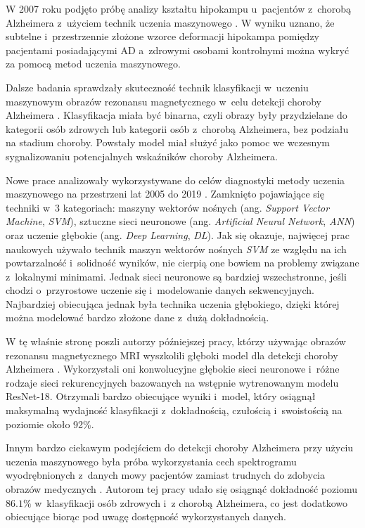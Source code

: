 {W 2007 roku podjęto próbę analizy kształtu hipokampu u~pacjentów z~chorobą Alzheimera z~użyciem technik uczenia maszynowego \cite{li2007hippocampal}.
W wyniku uznano, że subtelne i~przestrzennie złożone wzorce deformacji hipokampa pomiędzy pacjentami posiadającymi AD a~zdrowymi osobami kontrolnymi można wykryć za pomocą metod uczenia maszynowego.

Dalsze badania sprawdzały skuteczność technik klasyfikacji w~uczeniu maszynowym obrazów rezonansu magnetycznego w~celu detekcji choroby Alzheimera \cite{herrera2013classification}.
Klasyfikacja miała być binarna, czyli obrazy były przydzielane do kategorii osób zdrowych lub kategorii osób z~chorobą Alzheimera, bez podziału na stadium choroby.
Powstały model miał służyć jako pomoc we wczesnym sygnalizowaniu potencjalnych wskaźników choroby Alzheimera.

Nowe prace analizowały wykorzystywane do celów diagnostyki metody uczenia maszynowego na przestrzeni lat 2005 do 2019 \cite{tanveer2020machine}.
Zamknięto pojawiające się techniki w~3 kategoriach: maszyny wektorów nośnych (ang. \emph{Support Vector Machine}, \emph{SVM}), sztuczne sieci neuronowe (ang. \emph{Artificial Neural Network}, \emph{ANN}) oraz uczenie głębokie (ang. \emph{Deep Learning}, \emph{DL}).
Jak się okazuje, najwięcej prac naukowych używało technik maszyn wektorów nośnych \emph{SVM} ze względu na ich powtarzalność i~solidność wyników, nie cierpią one bowiem na problemy związane z~lokalnymi minimami.
Jednak sieci neuronowe są bardziej wszechstronne, jeśli chodzi o~przyrostowe uczenie się i~modelowanie danych sekwencyjnych.
Najbardziej obiecująca jednak była technika uczenia głębokiego, dzięki której można modelować bardzo złożone dane z~dużą dokładnością.

W tę właśnie stronę poszli autorzy późniejszej pracy, którzy używając obrazów rezonansu magnetycznego MRI wyszkolili głęboki model dla detekcji choroby Alzheimera \cite{ebrahimi2021deep}.
Wykorzystali oni konwolucyjne głębokie sieci neuronowe i~różne rodzaje sieci rekurencyjnych bazowanych na wstępnie wytrenowanym modelu ResNet-18.
Otrzymali bardzo obiecujące wyniki i~model, który osiągnął maksymalną wydajność klasyfikacji z~dokładnością, czułością i~swoistością na poziomie około 92\%.

Innym bardzo ciekawym podejściem do detekcji choroby Alzheimera przy użyciu uczenia maszynowego była próba wykorzystania cech spektrogramu wyodrębnionych z~danych mowy pacjentów zamiast trudnych do zdobycia obrazów medycznych \cite{liu2020new}.
Autorom tej pracy udało się osiągnąć dokładność poziomu $86.1\%$ w~klasyfikacji osób zdrowych i~z chorobą Alzheimera, co jest dodatkowo obiecujące biorąc pod uwagę dostępność wykorzystanych danych.

}
